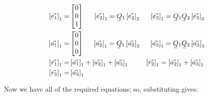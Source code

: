 \documentclass[conference]{IEEEtran}
\begin{document}
\begin{align}
    \left[\vec{e_1}\right]_1 = & \begin{bmatrix}
                                     0 \\
                                     0 \\
                                     1
                                 \end{bmatrix} \hspace{15px}
    \left[\vec{e_2}\right]_1 = \undertilde{Q}_1 \left[\vec{e_2}\right]_2 \hspace{15px}
    \left[\vec{e_3}\right]_1 = \undertilde{Q}_1 \undertilde{Q}_2 \left[\vec{e_3}\right]_3                                               \\
    \left[\vec{a_1}\right]_1 = & \begin{bmatrix}
                                     0 \\
                                     0 \\
                                     0
                                 \end{bmatrix} \hspace{14px}
    \left[\vec{a_2}\right]_1 = \undertilde{Q}_1 \left[\vec{a_2}\right]_2 \hspace{14px}
    \left[\vec{a_3}\right]_1 = \undertilde{Q}_1 \undertilde{Q}_2 \left[\vec{a_3}\right]_3                                               \\
    \left[\vec{r_1}\right]_1 = & \left[\vec{a_1}\right]_1 + \left[\vec{a_2}\right]_1 + \left[\vec{a_3}\right]_1 \nonumber \hspace{25px}
    \left[\vec{r_2}\right]_1 = \left[\vec{a_2}\right]_1 + \left[\vec{a_3}\right]_1                                                      \\
    \left[\vec{r_3}\right]_1 = & \left[\vec{a_3}\right]_1 \label{eq:r}
\end{align}

Now we have all of the required equations; so, substituting gives:
\end{document}
